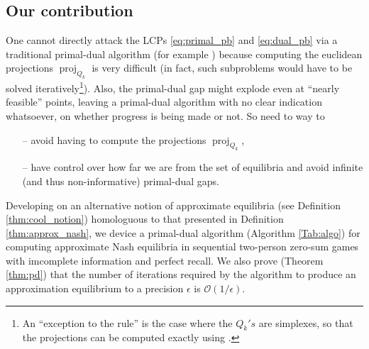 \documentclass{article} %
\DeclareMathOperator{\proj}{proj}
\begin{document}

\subsection{Our contribution}
One cannot directly attack the LCPs \eqref{eq:primal_pb} and
\eqref{eq:dual_pb} via a traditional primal-dual algorithm
(for example \cite{chambolle2010,chambolle2014ergodic}) because
computing the euclidean projections $\proj_{Q_k}$ is very difficult
(in fact, such subproblems would have to be solved
iteratively\footnote{An ``exception to the rule'' is the case where
  the $Q_k's$ are simplexes, so that the projections can be computed
  exactly using \cite{duchi2008efficient}.}). Also,
the primal-dual gap might explode even at ``nearly feasible'' points,
leaving a primal-dual algorithm with no clear indication whatsoever,
on whether progress is being made or not. So need to way to
\begin{itemize}
\item[--] avoid having to compute the projections $\proj_{Q_k}$,
\item[--] have control over how far we are from the set of equilibria and
  avoid infinite (and thus non-informative) primal-dual gaps.
\end{itemize}

Developing on an alternative notion of approximate equilibria (see
Definition \ref{thm:cool_notion})
homologuous to that presented in Definition \ref{thm:approx_nash}, we
device a primal-dual algorithm (Algorithm \ref{Tab:algo}) for
computing approximate Nash equilibria in sequential two-person
zero-sum games with imcomplete information and perfect recall. We also
prove (Theorem \ref{thm:pd})
that the number of iterations required by the algorithm to
produce an approximation equilibrium to a precision $\epsilon$ is
$\mathcal{O}(1/\epsilon)$.%
\end{document}
